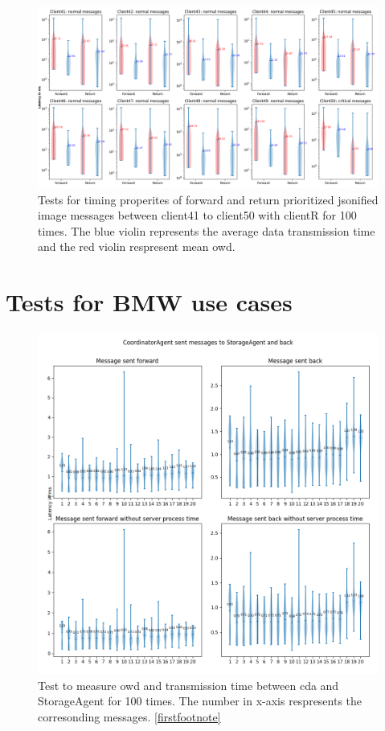 \begin{figure}
    \includegraphics[width=\textheight]{figures/appendix/priority_tests/log_violin_50clients_image_figure_5.png}\hfill 
    \caption{Tests for timing properites of forward and return prioritized jsonified image messages between client41 to client50 
    with clientR for 100 times. The blue violin represents the average data transmission time and the red violin 
    respresent mean \gls{owd}.} \label{fig: priority-50clients-image-e}
\end{figure}




\newpage
\section{Tests for BMW use cases}\label{chap: append-UC}

\begin{figure}[h]
    \includegraphics[width=\textwidth]{figures/appendix/usecase/violin_CoordinatorAgent_to_StorageAgent.png}
    \centering
    \caption{Test to measure \gls{owd} and transmission time between \gls{cda} and 
    StorageAgent for 100 times. The number in x-axis respresents the 
    corresonding messages. \protect\ref{firstfootnote}}
    \label{fig: violin-CDA-ST}
\end{figure}


